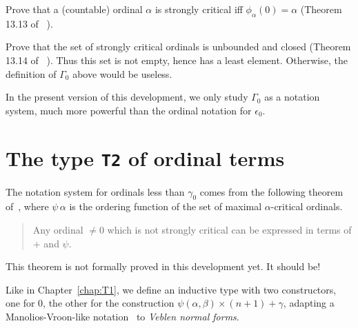{
\begin{project}
Prove that a (countable)  ordinal $\alpha$ is strongly critical iff 
$\phi_\alpha(0)=\alpha$ (Theorem 13.13 of~\cite{schutte} ). 
\end{project}


\begin{project}
Prove that the set of strongly critical ordinals is unbounded and closed (Theorem 13.14 of~\cite{schutte} ). Thus this set is not empty,  hence has a least element. Otherwise, the definition of $\Gamma_0$ above would be useless.
\end{project}




In the present version of this development, we  only study $\Gamma_0$ as a notation system, much more powerful than the ordinal notation for $\epsilon_0$.

%




\section{The type \texttt{T2} of ordinal terms}

The notation system for ordinals less than $\gamma_0$ comes from the following theorem of~\cite{schutte}, where $\psi\,\alpha$ is the ordering function 
of the set of maximal $\alpha$-critical ordinals.


\begin{quote}
  Any ordinal $\not= 0$ which is not strongly critical can be expressed in terms of $+$ and $\psi$.
\end{quote}

\begin{project}
This theorem is not formally proved in this development yet. It should be!
\end{project}


Like in Chapter~\ref{chap:T1}, we define an inductive type with two constructors, one for $0$, the other for the construction $\psi(\alpha,\beta)\times(n+1)+\gamma$, adapting a Manolios-Vroon-like notation~\cite{Manolios2005} to
\emph{Veblen normal forms}.
\label{types:T2}

}
